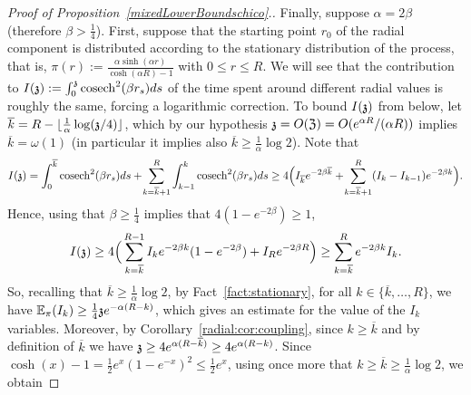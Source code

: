 \begin{proof}[Proof of Proposition~\ref{mixedLowerBoundschico}.]
Finally, suppose $\alpha=2\beta$ (therefore $\beta > \frac14$).
First, suppose that the starting point $r_0$ of the radial component is distributed according to the stationary distribution of the process, that is, $\pi(r):=\frac{\alpha\sinh(\alpha r)}{\cosh(\alpha R)-1}$ with $0\leq r\leq R$. 
We will see that the contribution to  $\II{\ss}:=\int_0^{\ss} \cosech^2(\beta r_s) ds$ of the time spent around different radial values is roughly the same, forcing a logarithmic correction. To bound $\II{\ss}$ from below, let $\overline{k}=R-\lfloor\tfrac{1}{\alpha}\log (\ss/4) \rfloor$, which by our hypothesis $\ss= O(\mathfrak{Z})=O(e^{\alpha R}/(\alpha R))$ implies $\overline{k}=\omega(1)$ (in particular it implies also $\overline{k} \ge \frac{1}{\alpha}\log 2$). 
Note that 
\[
\II{\ss} = \int_0^{\overline{k}}\cosech^2(\beta r_s)ds
  + \!\sum_{k=\overline{k}+1}^R \int_{k-1}^{k}\cosech^2(\beta r_s)ds
      \geq 4\Big(I_{\overline{k}}e^{-2\beta \overline{k}}+\!\sum_{k=\overline{k}+1}^R (I_k - I_{k-1})e^{-2\beta k}\Big).
\]
Hence, using that $\beta\geq\frac14$ implies that $4(1-e^{-2\beta})\geq 1$,
\begin{equation}%
    \II{\ss} 
    \geq 4\Big(\sum_{k=\overline{k}}^{R-1}I_ke^{-2\beta k}(1-e^{-2\beta}) +I_R e^{-2\beta R} \Big)
    \ge \sum_{k=\overline{k}}^R e^{-2\beta k}I_{k}.
\end{equation}
 So, recalling that $\overline{k}\ge \frac{1}{\alpha}\log 2$, by Fact~\ref{fact:stationary}, for all $k \in \{\overline{k},\ldots,R\}$, we have $\EE_{\pi}(I_k)\geq \frac14 \ss e^{-\alpha(R-k)}$,
which gives an estimate for the value of the $I_k$ variables. Moreover, by Corollary~\ref{radial:cor:coupling}, %
since $k \ge \overline{k}$ and by definition of $\overline{k}$ we have $\ss \ge 4e^{\alpha (R-\overline{k})} \ge 4e^{\alpha (R-k)}$. Since $\cosh(x)-1=\frac12 e^x(1-e^{-x})^2\le \frac12 e^x$, using once more that $k\ge\overline{k}\ge\frac{1}{\alpha}\log 2$, we obtain %

\end{proof}
